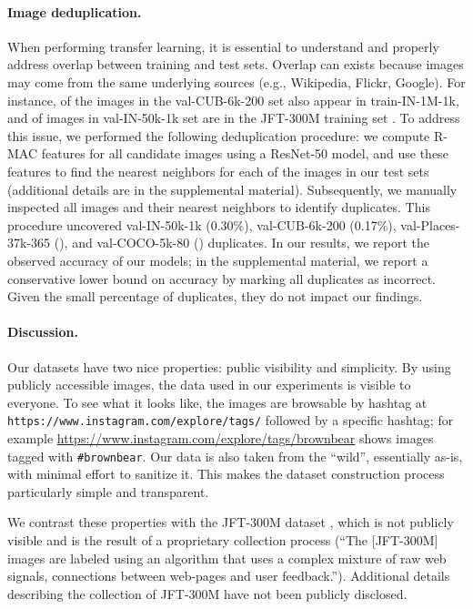 \documentclass[runningheads]{llncs}
\makeatletter
\newcommand{\eg}{e.g.\@\xspace}
\makeatother
\begin{document}
\paragraph{Image deduplication.} When performing transfer learning, it is essential to understand and properly address overlap between training and test sets. Overlap can exists because images may come from the same underlying sources (\eg, Wikipedia, Flickr, Google). For instance,  of the images in the val-CUB-6k-200 set \cite{welinder2010birds} also appear in train-IN-1M-1k, and  of images in val-IN-50k-1k set are in the JFT-300M training set \cite{sun2017unreasonable}. To address this issue, we performed the following deduplication procedure: we compute R-MAC features \cite{gordo2016rmac,tolias2016rmac} for all candidate images using a ResNet-50 model, and use these features to find the  nearest neighbors for each of the images in our test sets (additional details are in the supplemental material). Subsequently, we manually inspected all images and their nearest neighbors to identify duplicates. This procedure uncovered  val-IN-50k-1k (0.30\%),  val-CUB-6k-200 (0.17\%),  val-Places-37k-365 (), and  val-COCO-5k-80 () duplicates. In our results, we report the observed accuracy of our models; in the supplemental material, we report a conservative lower bound on accuracy by marking all duplicates as incorrect. Given the small percentage of duplicates, they do not impact our findings.

\paragraph{Discussion.} Our datasets have two nice properties: public visibility and simplicity. By using publicly accessible images, the data used in our experiments is visible to everyone. To see what it looks like, the images are browsable by hashtag at \texttt{https://www.instagram.com/explore/tags/} followed by a specific hashtag; for example \url{https://www.instagram.com/explore/tags/brownbear} shows images tagged with \texttt{\#brownbear}. Our data is also taken from the ``wild'', essentially as-is, with minimal effort to sanitize it. This makes the dataset construction process particularly simple and transparent.

We contrast these properties with the JFT-300M dataset \cite{sun2017unreasonable}, which is not publicly visible and is the result of a proprietary collection process (``The [JFT-300M] images are labeled using an algorithm that uses a complex mixture of raw web signals, connections between web-pages and user feedback.''). Additional details describing the collection of JFT-300M have not been publicly disclosed.
\end{document}
